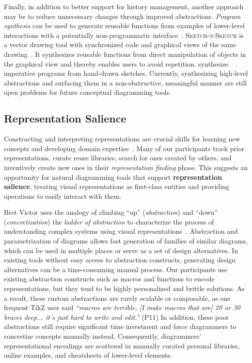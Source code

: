 Finally, in addition to better support for history management, another approach may be to reduce unnecessary changes through improved abstractions. \emph{Program synthesis} can be used to generate reusable functions from examples of lower-level interactions with a potentially non-programmatic interface~\cite{programSynthesis}. \textsc{Sketch-n-Sketch} is a vector drawing tool with synchronized code and graphical views of the same drawing~\cite{Sketch-n-Sketch}. It synthesizes reusable functions from direct manipulation of objects in the graphical view and thereby enables users to avoid repetition. \citet{Kevin-NIPS} synthesize imperative programs from hand-drawn sketches. Currently, synthesizing high-level abstractions and surfacing them in a non-obstructive, meaningful manner are still open problems for future conceptual diagramming tools.


\subsection{Representation Salience}

Constructing and interpreting representations are crucial skills for learning new concepts and developing domain expertise~\cite{ainsworth_drawing_2011}. Many of our participants track prior representations, curate reuse libraries, search for ones created by others, and inventively create new ones in their \emph{representation finding} phase. This suggests an opportunity for natural diagramming tools that support \textbf{representation salience}, treating visual representations as first-class entities and providing operations to easily interact with them. 

Bret Victor uses the analogy of climbing ``up'' (\emph{abstraction}) and ``down'' (\emph{concretization}) the \emph{ladder of abstraction} to characterize the process of understanding complex systems using visual representations~\cite{ladderOfAbstraction}. Abstraction and parametrization of diagrams allows fast generation of families of similar diagrams, which can be used in multiple places or serve as a set of design alternatives. In existing tools without easy access to abstraction constructs, generating design alternatives can be a time-consuming  manual process. Our participants use existing abstraction constructs such as macros and functions to encode representations, but they tend to be highly personalized and brittle solutions. As a result, these custom abstractions are rarely scalable or composable, as one frequent TikZ user said \textit{``macros are terrible, [I make macros that are] 20 or 30 braces deep... it's just hard to write and edit.''} (P11) In addition, these poor abstractions still require significant time investment and force diagrammers to concretize concepts manually instead. Consequently, diagrammers' representational encodings are scattered in manually curated personal libraries, online examples, and cheatsheets of lower-level elements.

